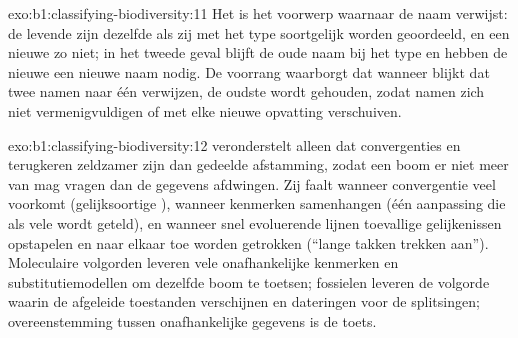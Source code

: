 \begin{solution}{exo:b1:classifying-biodiversity:11}
Het  is het voorwerp waarnaar de naam verwijst: de levende
 zijn dezelfde  als zij met het type soortgelijk worden
geoordeeld, en een nieuwe  zo niet; in het tweede geval blijft de oude
naam bij het type en hebben de nieuwe  een nieuwe naam nodig. De
voorrang waarborgt dat wanneer blijkt dat twee namen naar één 
verwijzen, de oudste wordt gehouden, zodat namen zich niet vermenigvuldigen
of met elke nieuwe opvatting verschuiven.
\end{solution}

\begin{solution}{exo:b1:classifying-biodiversity:12}
 veronderstelt alleen dat convergenties en terugkeren zeldzamer
zijn dan gedeelde afstamming, zodat een boom er niet meer van mag vragen dan
de gegevens afdwingen. Zij faalt wanneer convergentie veel voorkomt
(gelijksoortige ), wanneer kenmerken samenhangen (één aanpassing
die als vele wordt geteld), en wanneer snel evoluerende lijnen toevallige
gelijkenissen opstapelen en naar elkaar toe worden getrokken (``lange takken
trekken aan''). Moleculaire volgorden leveren vele onafhankelijke kenmerken
en substitutiemodellen om dezelfde boom te toetsen; fossielen leveren de
volgorde waarin de afgeleide toestanden verschijnen en dateringen voor de
splitsingen; overeenstemming tussen onafhankelijke gegevens is de toets.
\end{solution}

